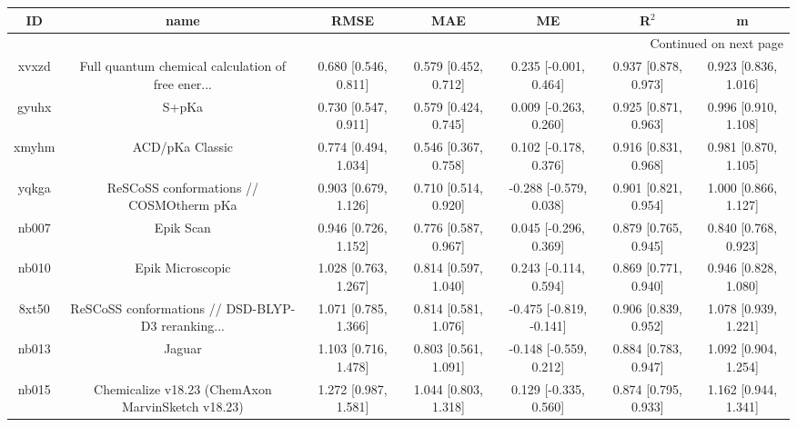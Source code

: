 \documentclass{article}
\begin{document}
\begin{center}
\begin{longtable}{|ccccccc|}
\toprule
    ID &                                               name &                  RMSE &                   MAE &                       ME &                 R$^2$ &                      m \\
\midrule
\endhead
\midrule
\multicolumn{7}{r}{{Continued on next page}} \\
\midrule
\endfoot

\bottomrule
\endlastfoot
 xvxzd &  Full quantum chemical calculation of free ener... &  0.680 [0.546, 0.811] &  0.579 [0.452, 0.712] &    0.235 [-0.001, 0.464] &  0.937 [0.878, 0.973] &   0.923 [0.836, 1.016] \\
 gyuhx &                                              S+pKa &  0.730 [0.547, 0.911] &  0.579 [0.424, 0.745] &    0.009 [-0.263, 0.260] &  0.925 [0.871, 0.963] &   0.996 [0.910, 1.108] \\
 xmyhm &                                    ACD/pKa Classic &  0.774 [0.494, 1.034] &  0.546 [0.367, 0.758] &    0.102 [-0.178, 0.376] &  0.916 [0.831, 0.968] &   0.981 [0.870, 1.105] \\
 yqkga &            ReSCoSS conformations // COSMOtherm pKa &  0.903 [0.679, 1.126] &  0.710 [0.514, 0.920] &   -0.288 [-0.579, 0.038] &  0.901 [0.821, 0.954] &   1.000 [0.866, 1.127] \\
 nb007 &                                          Epik Scan &  0.946 [0.726, 1.152] &  0.776 [0.587, 0.967] &    0.045 [-0.296, 0.369] &  0.879 [0.765, 0.945] &   0.840 [0.768, 0.923] \\
 nb010 &                                   Epik Microscopic &  1.028 [0.763, 1.267] &  0.814 [0.597, 1.040] &    0.243 [-0.114, 0.594] &  0.869 [0.771, 0.940] &   0.946 [0.828, 1.080] \\
 8xt50 &  ReSCoSS conformations // DSD-BLYP-D3 reranking... &  1.071 [0.785, 1.366] &  0.814 [0.581, 1.076] &  -0.475 [-0.819, -0.141] &  0.906 [0.839, 0.952] &   1.078 [0.939, 1.221] \\
 nb013 &                                             Jaguar &  1.103 [0.716, 1.478] &  0.803 [0.561, 1.091] &   -0.148 [-0.559, 0.212] &  0.884 [0.783, 0.947] &   1.092 [0.904, 1.254] \\
 nb015 &  Chemicalize v18.23 (ChemAxon MarvinSketch v18.23) &  1.272 [0.987, 1.581] &  1.044 [0.803, 1.318] &    0.129 [-0.335, 0.560] &  0.874 [0.795, 0.933] &   1.162 [0.944, 1.341] \\

\end{longtable}
\end{center}
\end{document}
